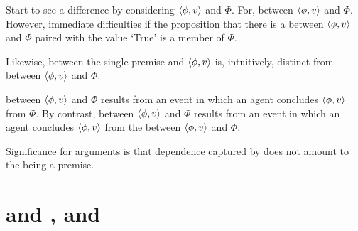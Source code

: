\begin{note}
  Start to see a difference by considering \(\langle \phi, v \rangle\) and \(\Phi\).
  For, \ros{} between \(\langle \phi, v \rangle\) and \(\Phi\).
  However, immediate difficulties if the proposition that there is a \ros{} between \(\langle \phi, v \rangle\) and \(\Phi\) paired with the value `True' is a member of \(\Phi\).

  Likewise, \ros{} between the single premise and \(\langle \phi, v \rangle\) is, intuitively, distinct from \ros{} between \(\langle \phi, v \rangle\) and \(\Phi\).

  \ros{} between \(\langle \phi, v \rangle\) and \(\Phi\) results from an event in which an agent concludes \(\langle \phi, v \rangle\) from \(\Phi\).
  By contrast, \ros{} between \(\langle \phi, v \rangle\) and \(\Phi\) results from an event in which an agent concludes \(\langle \phi, v \rangle\) from the \ros{} between \(\langle \phi, v \rangle\) and \(\Phi\).
\end{note}

\begin{note}
  Significance for arguments is that dependence captured by \qWhyVnP{} does not amount to the \ros{} being a premise.
\end{note}


\section{\qWhyVnP{} and \qHowV{}, and \issueConstraint{}}
\label{sec:variants-initial}

